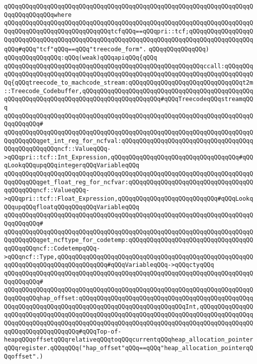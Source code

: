 \verb|qQQqqQQqqQQqqQQqqQQqqQQqqQQqqQQqqQQqqQQqqQQqqQQqqQQqqQQqqQQqqQQqqQQqqQQqqQQqqQQqqQQqwhere|\newline
\verb|qQQqqQQqqQQqqQQqqQQqqQQqqQQqqQQqqQQqqQQqqQQqqQQqqQQqqQQqqQQqqQQqqQQqqQQqqQQqqQQqqQQqqQQqqQQqqQQqqQQqtcfqQQq==qQQqpri::tcf;qQQqqQQqqQQqqQQqqQQqqQQqqQQqqQQqqQQqqQQqqQQqqQQqqQQqqQQqqQQqqQQqqQQqqQQqqQQqqQQqqQQqqQQqqQQq#qQQq"tcf"qQQq==qQQq"treecode_form".|\newline
\verb|qQQqqQQqqQQqqQQq)|\newline
\newline
\verb|qQQqqQQqqQQqqQQq:qQQq(weak)qQQqapiqQQq{qQQq|\newline
\verb|qQQqqQQqqQQqqQQqqQQqqQQqqQQqqQQqqQQqqQQqqQQqqQQqqQQqqQQqccall:qQQqqQQq|\newline
\verb|qQQqqQQqqQQqqQQqqQQqqQQqqQQqqQQqqQQqqQQqqQQqqQQqqQQqqQQqqQQqqQQqqQQqqQQq{qQQqtreecode_to_machcode_stream:qQQqqQQqqQQqqQQqqQQqqQQqqQQqqQQqt2m::Treecode_Codebuffer,qQQqqQQqqQQqqQQqqQQqqQQqqQQqqQQqqQQqqQQqqQQqqQQqqQQqqQQqqQQqqQQqqQQqqQQqqQQqqQQqqQQqqQQqqQQq#qQQqTreecodeqQQqstreamqQQq|\newline
\verb|qQQqqQQqqQQqqQQqqQQqqQQqqQQqqQQqqQQqqQQqqQQqqQQqqQQqqQQqqQQqqQQqqQQqqQQqqQQqqQQq#|\newline
\verb|qQQqqQQqqQQqqQQqqQQqqQQqqQQqqQQqqQQqqQQqqQQqqQQqqQQqqQQqqQQqqQQqqQQqqQQqqQQqqQQqget_int_reg_for_ncfval:qQQqqQQqqQQqqQQqqQQqqQQqqQQqqQQqqQQqqQQqqQQqqQQqqQQqncf::ValueqQQq->qQQqpri::tcf::Int_Expression,qQQqqQQqqQQqqQQqqQQqqQQqqQQqqQQqqQQq#qQQqLookqQQqupqQQqintegerqQQqVariableqQQq|\newline
\verb|qQQqqQQqqQQqqQQqqQQqqQQqqQQqqQQqqQQqqQQqqQQqqQQqqQQqqQQqqQQqqQQqqQQqqQQqqQQqqQQqget_float_reg_for_ncfvar:qQQqqQQqqQQqqQQqqQQqqQQqqQQqqQQqqQQqqQQqqQQqncf::ValueqQQq->qQQqpri::tcf::Float_Expression,qQQqqQQqqQQqqQQqqQQqqQQqqQQq#qQQqLookqQQqupqQQqfloatqQQqqQQqqQQqVariableqQQq|\newline
\verb|qQQqqQQqqQQqqQQqqQQqqQQqqQQqqQQqqQQqqQQqqQQqqQQqqQQqqQQqqQQqqQQqqQQqqQQqqQQqqQQq#|\newline
\verb|qQQqqQQqqQQqqQQqqQQqqQQqqQQqqQQqqQQqqQQqqQQqqQQqqQQqqQQqqQQqqQQqqQQqqQQqqQQqqQQqget_ncftype_for_codetemp:qQQqqQQqqQQqqQQqqQQqqQQqqQQqqQQqqQQqqQQqqQQqncf::CodetempqQQq->qQQqncf::Type,qQQqqQQqqQQqqQQqqQQqqQQqqQQqqQQqqQQqqQQqqQQqqQQqqQQqqQQqqQQqqQQqqQQqqQQqqQQqqQQqqQQq#qQQqVariableqQQq->qQQqctyqQQq|\newline
\verb|qQQqqQQqqQQqqQQqqQQqqQQqqQQqqQQqqQQqqQQqqQQqqQQqqQQqqQQqqQQqqQQqqQQqqQQqqQQqqQQq#|\newline
\verb|qQQqqQQqqQQqqQQqqQQqqQQqqQQqqQQqqQQqqQQqqQQqqQQqqQQqqQQqqQQqqQQqqQQqqQQqqQQqqQQqhap_offset:qQQqqQQqqQQqqQQqqQQqqQQqqQQqqQQqqQQqqQQqqQQqqQQqqQQqqQQqqQQqqQQqqQQqqQQqqQQqqQQqqQQqqQQqqQQqqQQqqQQqInt,qQQqqQQqqQQqqQQqqQQqqQQqqQQqqQQqqQQqqQQqqQQqqQQqqQQqqQQqqQQqqQQqqQQqqQQqqQQqqQQqqQQqqQQqqQQqqQQqqQQqqQQqqQQqqQQqqQQqqQQqqQQqqQQqqQQqqQQqqQQqqQQqqQQqqQQqqQQqqQQqqQQqqQQqqQQqqQQq#qQQqTop-of-heapqQQqoffsetqQQqrelativeqQQqtoqQQqcurrentqQQqheap_allocation_pointerqQQqregister.qQQqqQQq("hap_offset"qQQq==qQQq"heap_allocation_pointerqQQqoffset".)|\newline
